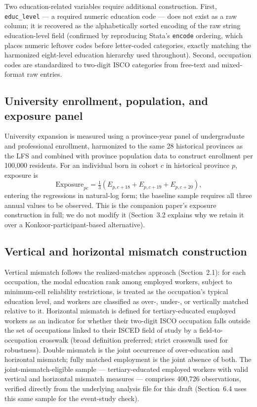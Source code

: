 \documentclass[11pt]{article}
\begin{document}
Two education-related variables require additional construction. First, \texttt{educ\_level} --- a required numeric education code --- does not exist as a raw column; it is recovered as the alphabetically sorted encoding of the raw string education-level field (confirmed by reproducing Stata's \texttt{encode} ordering, which places numeric leftover codes before letter-coded categories, exactly matching the harmonized eight-level education hierarchy used throughout). Second, occupation codes are standardized to two-digit ISCO categories from free-text and mixed-format raw entries.

\subsection{University enrollment, population, and exposure panel}

University expansion is measured using a province-year panel of undergraduate and professional enrollment, harmonized to the same 28 historical provinces as the LFS and combined with province population data to construct enrollment per 100{,}000 residents. For an individual born in cohort $c$ in historical province $p$, exposure is
\begin{equation}
\text{Exposure}_{pc} = \tfrac{1}{3}\left(E_{p,c+18} + E_{p,c+19} + E_{p,c+20}\right),
\end{equation}
entering the regressions in natural-log form; the baseline sample requires all three annual values to be observed. This is the companion paper's exposure construction in full; we do not modify it (Section~3.2 explains why we retain it over a Konkoor-participant-based alternative).

\subsection{Vertical and horizontal mismatch construction}

Vertical mismatch follows the realized-matches approach (Section~2.1): for each occupation, the modal education rank among employed workers, subject to minimum-cell reliability restrictions, is treated as the occupation's typical education level, and workers are classified as over-, under-, or vertically matched relative to it. Horizontal mismatch is defined for tertiary-educated employed workers as an indicator for whether their two-digit ISCO occupation falls outside the set of occupations linked to their ISCED field of study by a field-to-occupation crosswalk (broad definition preferred; strict crosswalk used for robustness). Double mismatch is the joint occurrence of over-education and horizontal mismatch; fully matched employment is the joint absence of both. The joint-mismatch-eligible sample --- tertiary-educated employed workers with valid vertical and horizontal mismatch measures --- comprises 400{,}726 observations, verified directly from the underlying analysis file for this draft (Section~6.4 uses this same sample for the event-study check).
\end{document}
